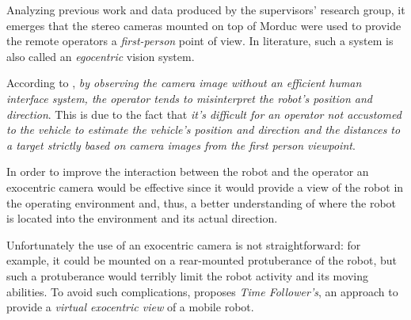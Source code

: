 %
Analyzing previous work and data produced by the supervisors' 
research group, it emerges that the stereo cameras mounted on 
top of Morduc were used to provide the remote operators a 
\textit{first-person} point of view. In literature, such a 
system is also called an \textit{egocentric} vision system.
%

%
According to \cite{sugimoto}, \textit{by observing the camera image 
without an efficient human interface system, the operator 
tends to misinterpret the robot's position and direction}. This is 
due to the fact that  \textit{it's difficult for an
operator not accustomed to the vehicle to estimate the
vehicle's position and direction and the distances to a
target strictly based on camera images from the first person 
viewpoint}.
%

%
In order to improve the interaction between the robot and the operator 
an exocentric camera would be effective since it would provide a 
view of the robot in the operating environment and, thus, 
a better understanding of where the robot is located into the
 environment and its actual direction.
%

%
Unfortunately the use of an exocentric camera is not straightforward: 
for example, it could be mounted on a rear-mounted protuberance of the 
robot, but such a protuberance would terribly limit the robot activity and 
its moving abilities.
%
To avoid such complications, \cite{sugimoto} proposes 
\textit{Time Follower's}, an approach to provide a \textit{virtual exocentric 
view} of a mobile robot.
%
